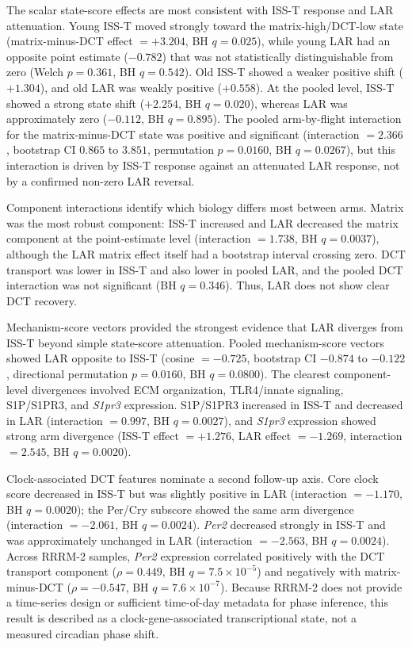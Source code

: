 \documentclass[11pt]{article}
\newcommand{\gene}[1]{\textit{#1}}
\begin{document}
The scalar state-score effects are most consistent with ISS-T response and LAR attenuation. Young ISS-T moved strongly toward the matrix-high/DCT-low state (matrix-minus-DCT effect $=+3.204$, BH $q=0.025$), while young LAR had an opposite point estimate ($-0.782$) that was not statistically distinguishable from zero (Welch $p=0.361$, BH $q=0.542$). Old ISS-T showed a weaker positive shift ($+1.304$), and old LAR was weakly positive ($+0.558$). At the pooled level, ISS-T showed a strong state shift ($+2.254$, BH $q=0.020$), whereas LAR was approximately zero ($-0.112$, BH $q=0.895$). The pooled arm-by-flight interaction for the matrix-minus-DCT state was positive and significant (interaction $=2.366$, bootstrap CI $0.865$ to $3.851$, permutation $p=0.0160$, BH $q=0.0267$), but this interaction is driven by ISS-T response against an attenuated LAR response, not by a confirmed non-zero LAR reversal.

Component interactions identify which biology differs most between arms. Matrix was the most robust component: ISS-T increased and LAR decreased the matrix component at the point-estimate level (interaction $=1.738$, BH $q=0.0037$), although the LAR matrix effect itself had a bootstrap interval crossing zero. DCT transport was lower in ISS-T and also lower in pooled LAR, and the pooled DCT interaction was not significant (BH $q=0.346$). Thus, LAR does not show clear DCT recovery.

Mechanism-score vectors provided the strongest evidence that LAR diverges from ISS-T beyond simple state-score attenuation. Pooled mechanism-score vectors showed LAR opposite to ISS-T (cosine $=-0.725$, bootstrap CI $-0.874$ to $-0.122$, directional permutation $p=0.0160$, BH $q=0.0800$). The clearest component-level divergences involved ECM organization, TLR4/innate signaling, S1P/S1PR3, and \gene{S1pr3} expression. S1P/S1PR3 increased in ISS-T and decreased in LAR (interaction $=0.997$, BH $q=0.0027$), and \gene{S1pr3} expression showed strong arm divergence (ISS-T effect $=+1.276$, LAR effect $=-1.269$, interaction $=2.545$, BH $q=0.0020$).

Clock-associated DCT features nominate a second follow-up axis. Core clock score decreased in ISS-T but was slightly positive in LAR (interaction $=-1.170$, BH $q=0.0020$); the Per/Cry subscore showed the same arm divergence (interaction $=-2.061$, BH $q=0.0024$). \gene{Per2} decreased strongly in ISS-T and was approximately unchanged in LAR (interaction $=-2.563$, BH $q=0.0024$). Across RRRM-2 samples, \gene{Per2} expression correlated positively with the DCT transport component ($\rho=0.449$, BH $q=7.5\times10^{-5}$) and negatively with matrix-minus-DCT ($\rho=-0.547$, BH $q=7.6\times10^{-7}$). Because RRRM-2 does not provide a time-series design or sufficient time-of-day metadata for phase inference, this result is described as a clock-gene-associated transcriptional state, not a measured circadian phase shift.
\end{document}
